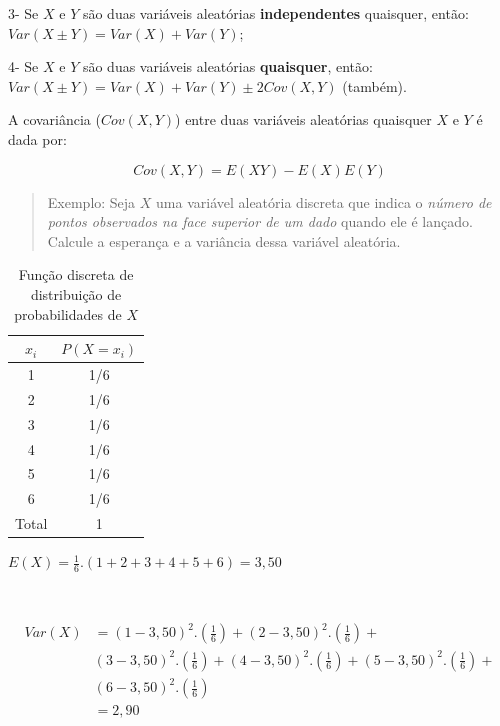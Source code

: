 \documentclass[
]{book}
\begin{document}
3- Se \(X\) e \(Y\) são duas variáveis aleatórias \textbf{independentes} quaisquer, então: \(Var(X \pm Y)=Var(X)+Var(Y)\);

4- Se \(X\) e \(Y\) são duas variáveis aleatórias \textbf{quaisquer}, então: \(Var(X \pm Y)=Var(X)+Var(Y) \pm 2Cov(X,Y)\) (também).

\hfill\break

A covariância (\(Cov(X,Y)\)) entre duas variáveis aleatórias quaisquer \(X\) e \(Y\) é dada por:

\hfill\break

\[
Cov \left(X,Y\right)= E(XY) - E(X)E(Y)
\]

\hfill\break

\hfill\break

\begin{quote}
Exemplo: Seja \(X\) uma variável aleatória discreta que indica o \emph{número de pontos observados na face superior de um dado} quando ele é lançado. Calcule a esperança e a variância dessa variável aleatória.
\end{quote}

\hfill\break

\begin{table}[htbp]
\centering
\caption*{Função discreta de distribuição de probabilidades de $X$}
\begin{tabular}{|c|c|}
\hline
$x_{i}$  & $P(X=x_{i})$ \\
\hline
1 & 1/6 \\
\hline
2 & 1/6 \\
\hline
3 & 1/6 \\
\hline
4 & 1/6 \\
\hline
5 & 1/6 \\
\hline
6 & 1/6 \\
\hline
Total & 1  \\
\hline
\end{tabular}
\end{table}

\hfill\break

\(E(X) = \frac{1}{6} . (1+2+3+4+5+6) = 3,50\)

~

\begin{align*}
Var(X) & = (1-3,50)^{2}.(\frac{1}{6}) + (2-3,50)^{2}.(\frac{1}{6}) +\\
       & (3-3,50)^{2}.(\frac{1}{6}) + (4-3,50)^{2}.(\frac{1}{6}) + (5-3,50)^{2}.(\frac{1}{6}) + \\
       & (6-3,50)^{2}.(\frac{1}{6}) \\
       & = 2,90
\end{align*}
\end{document}
